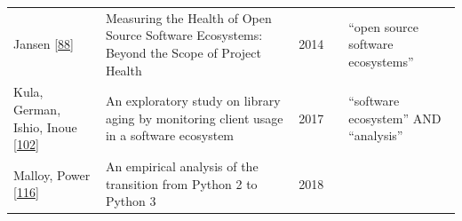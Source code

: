 \documentclass[]{book}
\begin{document}
\begin{longtable}[]{@{}lllll@{}}
\begin{minipage}[t]{0.05\columnwidth}
Jansen {[}\protect\hyperlink{ref-Jansen2014}{88}{]}\strut
\end{minipage} & \begin{minipage}[t]{0.31\columnwidth}\raggedright\strut
Measuring the Health of Open Source Software Ecosystems: Beyond the
Scope of Project Health\strut
\end{minipage} & \begin{minipage}[t]{0.02\columnwidth}\raggedright\strut
2014\strut
\end{minipage} & \begin{minipage}[t]{0.34\columnwidth}\raggedright\strut
\strut
\end{minipage} & \begin{minipage}[t]{0.13\columnwidth}\raggedright\strut
``open source software ecosystems''\strut
\end{minipage}\tabularnewline
\begin{minipage}[t]{0.05\columnwidth}\raggedright\strut
Kula, German, Ishio, Inoue
{[}\protect\hyperlink{ref-Kula2017-2}{102}{]}\strut
\end{minipage} & \begin{minipage}[t]{0.31\columnwidth}\raggedright\strut
An exploratory study on library aging by monitoring client usage in a
software ecosystem\strut
\end{minipage} & \begin{minipage}[t]{0.02\columnwidth}\raggedright\strut
2017\strut
\end{minipage} & \begin{minipage}[t]{0.34\columnwidth}\raggedright\strut
\strut
\end{minipage} & \begin{minipage}[t]{0.13\columnwidth}\raggedright\strut
``software ecosystem'' AND ``analysis''\strut
\end{minipage}\tabularnewline
\begin{minipage}[t]{0.05\columnwidth}\raggedright\strut
Malloy, Power {[}\protect\hyperlink{ref-Malloy2018}{116}{]}\strut
\end{minipage} & \begin{minipage}[t]{0.31\columnwidth}\raggedright\strut
An empirical analysis of the transition from Python 2 to Python 3\strut
\end{minipage} & \begin{minipage}[t]{0.02\columnwidth}\raggedright\strut
2018\strut
\end{minipage} & \begin{minipage}[t]{0.34\columnwidth}\raggedright\strut

\end{minipage}
\end{longtable}
\end{document}
